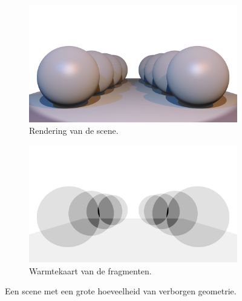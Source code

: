 \begin{figure}
  \begin{subfigure}[b]{.49\textwidth}
    \centering
    \includegraphics[width=\textwidth]{./img/raw/fds-scene/scene.png}
    \caption{Rendering van de scene.}
    \label{fig:fds-scene:scene}
  \end{subfigure} %
  \begin{subfigure}[b]{.49\textwidth}
    \centering
    \includegraphics[width=\textwidth]{./img/raw/fds-scene/heatmap.png}
    \caption{Warmtekaart van de fragmenten.}
    \label{fig:fds-scene:heatmap}
  \end{subfigure}
  \caption{Een scene met een grote hoeveelheid van verborgen geometrie.}
  \label{fig:fds-scene}
\end{figure}
